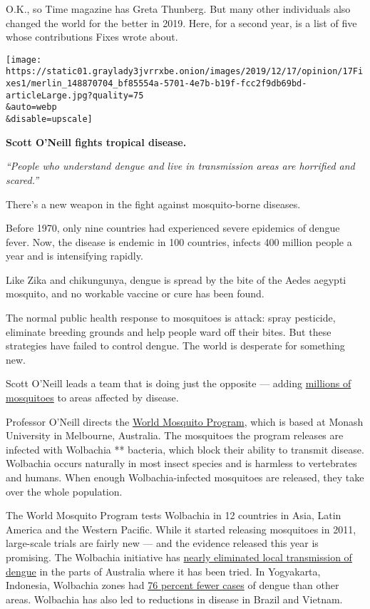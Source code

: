 O.K., so Time magazine has Greta Thunberg. But many other individuals
also changed the world for the better in 2019. Here, for a second year,
is a list of five whose contributions Fixes wrote about.

\texttt{[image: https://static01.graylady3jvrrxbe.onion/images/2019/12/17/opinion/17Fixes1/merlin\_148870704\_bf85554a-5701-4e7b-b19f-fcc2f9db69bd-articleLarge.jpg?quality=75\\\&auto=webp\\\&disable=upscale]}

\textbf{Scott O'Neill fights tropical disease.}

\emph{``People who understand dengue and live in transmission areas are
horrified and scared.''}

There's a new weapon in the fight against mosquito-borne diseases.

Before 1970, only nine countries had experienced severe epidemics of
dengue fever. Now, the disease is endemic in 100 countries, infects 400
million people a year and is intensifying rapidly.

Like Zika and chikungunya, dengue is spread by the bite of the Aedes
aegypti mosquito, and no workable vaccine or cure has been found.

The normal public health response to mosquitoes is attack: spray
pesticide, eliminate breeding grounds and help people ward off their
bites. But these strategies have failed to control dengue. The world is
desperate for something new.

Scott O'Neill leads a team that is doing just the opposite --- adding
\href{https://www.nytimes3xbfgragh.onion/2019/01/08/opinion/mosquito-fighting-tropical-disease.html}{millions
of mosquitoes} to areas affected by disease.

Professor O'Neill directs the \href{http://www.worldmosquito.org/}{World
Mosquito Program}, which is based at Monash University in Melbourne,
Australia. The mosquitoes the program releases are infected with
Wolbachia ** bacteria, which block their ability to transmit disease.
Wolbachia occurs naturally in most insect species and is harmless to
vertebrates and humans. When enough Wolbachia-infected mosquitoes are
released, they take over the whole population.

The World Mosquito Program tests Wolbachia in 12 countries in Asia,
Latin America and the Western Pacific. While it started releasing
mosquitoes in 2011, large-scale trials are fairly new --- and the
evidence released this year is promising. The Wolbachia initiative has
\href{https://gatesopenresearch.org/articles/3-1547}{nearly eliminated
local transmission of dengue} in the parts of Australia where it has
been tried. In Yogyakarta, Indonesia, Wolbachia zones had
\href{https://www.nature.com/articles/d41586-019-03660-8}{76 percent
fewer cases} of dengue than other areas. Wolbachia has also led to
reductions in disease in Brazil and Vietnam.

